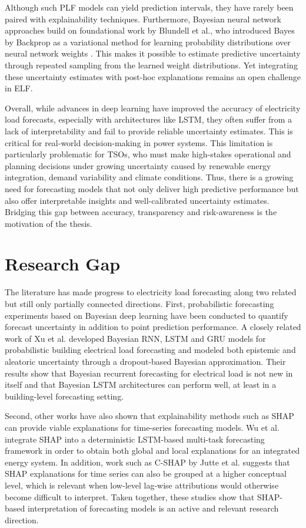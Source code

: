 \documentclass[Master,english,IEEE]{twbook}
\begin{document}
Although such PLF models can yield prediction intervals, they have rarely been paired with explainability techniques. Furthermore, Bayesian neural network approaches build on foundational work by Blundell et al., who introduced Bayes by Backprop as a variational method for learning probability distributions over neural network weights \cite{blundellWeightUncertaintyNeural2015}. This makes it possible to estimate predictive uncertainty through repeated sampling from the learned weight distributions. Yet integrating these uncertainty estimates with post-hoc explanations remains an open challenge in ELF.

Overall, while advances in deep learning have improved the accuracy of electricity load forecasts, especially with architectures like LSTM, they often suffer from a lack of interpretability and fail to provide reliable uncertainty estimates. This is critical for real-world decision-making in power systems. This limitation is particularly problematic for TSOs, who must make high-stakes operational and planning decisions under growing uncertainty caused by renewable energy integration, demand variability and climate conditions. Thus, there is a growing need for forecasting models that not only deliver high predictive performance but also offer interpretable insights and well-calibrated uncertainty estimates. Bridging this gap between accuracy, transparency and risk-awareness is the motivation of the thesis.

\section{Research Gap}

The literature has made progress to electricity load forecasting along two related but still only partially connected directions. First, probabilistic forecasting experiments based on Bayesian deep learning have been conducted to quantify forecast uncertainty in addition to point prediction performance. A closely related work of Xu et al. \cite{xuProbabilisticElectricalLoad2022} developed Bayesian RNN, LSTM and GRU models for probabilistic building electrical load forecasting and modeled both epistemic and aleatoric uncertainty through a dropout-based Bayesian approximation. Their results show that Bayesian recurrent forecasting for electrical load is not new in itself and that Bayesian LSTM architectures can perform well, at least in a building-level forecasting setting.

Second, other works have also shown that explainability methods such as SHAP can provide viable explanations for time-series forecasting models. Wu et al. \cite{wuExplainableFrameworkLoad2022} integrate SHAP into a deterministic LSTM-based multi-task forecasting framework in order to obtain both global and local explanations for an integrated energy system. In addition, work such as C-SHAP by Jutte et al. \cite{jutteCSHAPTimeSeries2025} suggests that SHAP explanations for time series can also be grouped at a higher conceptual level, which is relevant when low-level lag-wise attributions would otherwise become difficult to interpret. Taken together, these studies show that SHAP-based interpretation of forecasting models is an active and relevant research direction.
\end{document}
